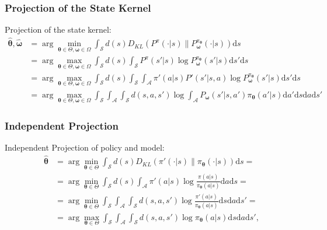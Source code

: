 \documentclass[english,aspectratio=1610]{beamer}
\theoremstyle{mystyle}
\theoremstyle{mystyle}
\theoremstyle{mystyle}
\begin{document}
\begin{frame}
	\frametitle{Projection of the State Kernel}
	Projection of the state kernel:
	\begin{align*}
	\widehat{\bm{\theta}}, \widehat{\bm{\omega}} & = \arg \min_{\bm{\theta} \in \Theta, \bm{\omega} \in \Omega} \int_{\mathcal{S}} d(s) D_{KL} (P^{\pi}(\cdot|s) \| P_{\bm{\omega}}^{\pi_{\bm{\theta}}}(\cdot|s)) \mathrm{d}s \\
    & = \arg \max_{\bm{\theta} \in \Theta, \bm{\omega} \in \Omega} \int_{\mathcal{S}} d(s) \int_{\mathcal{S}} P^{\pi}(s'|s) \log P_{\bm{\omega}}^{\pi_{\bm{\theta}}}(s'|s) \mathrm{d}s' \mathrm{d}s \\
    & = \arg \max_{\bm{\theta} \in \Theta, \bm{\omega} \in \Omega} \int_{\mathcal{S}} d(s) \int_{\mathcal{S}} \int_{\mathcal{A}} \pi'(a|s)P'(s'|s, a) \log P_{\bm{\omega}}^{\pi_{\bm{\theta}}}(s'|s) \mathrm{d}s' \mathrm{d}s \\
    & = \arg \max_{\bm{\theta} \in \Theta, \bm{\omega} \in \Omega} \int_{\mathcal{S}}\int_{\mathcal{A}}\int_{\mathcal{S}} d(s,a,s') \log \int_{\mathcal{A}} P_{\bm{\omega}}(s'|s,a') \pi_{\bm{\theta}}(a'|s) \mathrm{d}a' \mathrm{d}s \mathrm{d}a \mathrm{d}s'
\end{align*}
\end{frame}

\begin{frame}
	\frametitle{Independent Projection}
	Independent Projection of policy and model:
	\begin{align}
	\widehat{\bm{\theta}} & = \arg \min_{\bm{\theta} \in \Theta} \int_{\mathcal{S}} d(s) D_{KL} (\pi'(\cdot|s) \| \pi_{\bm{\theta}} (\cdot|s)) \mathrm{d}s = \\
    & = \arg \min_{\bm{\theta} \in \Theta} \int_{\mathcal{S}} d(s) \int_{\mathcal{A}} \pi'(a|s) \log \frac{\pi(a|s)}{\pi_{\bm{\theta}} (a|s)} \mathrm{d}a \mathrm{d}s = \\
    & = \arg \min_{\bm{\theta} \in \Theta} \int_{\mathcal{S}} \int_{\mathcal{A}}  \int_{\mathcal{S}}  d(s,a,s') \log \frac{\pi'(a|s)}{\pi_{\bm{\theta}} (a|s)} \mathrm{d}s \mathrm{d}a \mathrm{d}s' = \\
    & = \arg \max_{\bm{\theta} \in \Theta} \int_{\mathcal{S}} \int_{\mathcal{A}}  \int_{\mathcal{S}} d(s,a,s') \log \pi_{\bm{\theta}} (a|s) \mathrm{d}s \mathrm{d}a \mathrm{d}s',
\end{align}
	
\end{frame}
\end{document}
